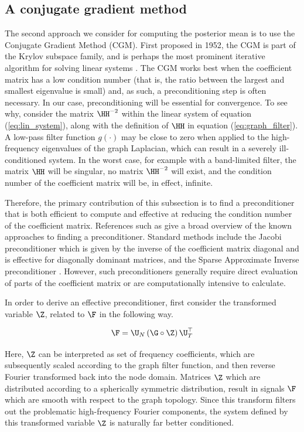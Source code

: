 \subsection{A conjugate gradient method}

The second approach we consider for computing the posterior mean is to use the Conjugate Gradient Method (CGM). First proposed in 1952, the CGM is part of the Krylov subspace family, and is perhaps the most prominent iterative algorithm for solving linear systems \citep{Hestenes1952, Kelley1995}. The CGM works best when the coefficient matrix has a low condition number (that is, the ratio between the largest and smallest eigenvalue is small) and, as such, a preconditioning step is often necessary. In our case, preconditioning will be essential for convergence. To see why, consider the matrix $\HH^{-2}$ within the linear system of equation (\ref{eq:lin_system}), along with the definition of $\HH$ in equation (\ref{eq:graph_filter}). A low-pass filter function $g(\cdot)$ may be close to zero when applied to the  high-frequency eigenvalues of the graph Laplacian, which can result in a severely ill-conditioned system. In the worst case, for example with a band-limited filter, the matrix $\HH$ will be singular, no matrix $\HH^{-2}$ will exist, and the condition number of the coefficient matrix will be, in effect, infinite.

Therefore, the primary contribution of this subsection is to find a preconditioner that is both efficient to compute and effective at reducing the condition number of the coefficient matrix. References such as \citep{Saad2003} give a broad overview of the known approaches to finding a preconditioner. Standard methods include the Jacobi preconditioner which is given by the inverse of the coefficient matrix diagonal and is effective for diagonally dominant matrices, and the Sparse Approximate Inverse preconditioner \citep{Grote1997}. However, such preconditioners generally require direct evaluation of parts of the coefficient matrix or are computationally intensive to calculate. 

In order to derive an effective preconditioner, first consider the transformed variable $\Z$, related to $\F$ in the following way. 

\begin{equation}
    \label{eq:Z_transform}
        \F = \U_N \, (\G \circ \Z) \, \U_T^\top
    \end{equation}
    
Here, $\Z$ can be interpreted as set of frequency coefficients, which are subsequently scaled according to the graph filter function, and then reverse Fourier transformed back into the node domain. Matrices $\Z$ which are distributed according to a spherically symmetric distribution, result in signals $\F$ which are smooth with respect to the graph topology. Since this transform filters out the problematic high-frequency Fourier components, the system defined by this transformed variable $\Z$ is naturally far better conditioned. 
    
